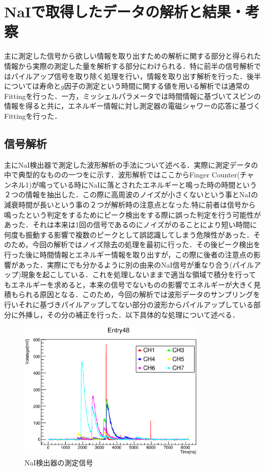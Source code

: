 
%
\section{NaIで取得したデータの解析と結果・考察}
主に測定した信号から欲しい情報を取り出すための解析に関する部分と得られた情報から実際の測定した量を解析する部分にわけられる．特に前半の信号解析ではパイルアップ信号を取り除く処理を行い，情報を取り出す解析を行った．後半については寿命と$g$因子の測定という時間に関する値を用いる解析では通常のFittingを行った．一方，ミッシェルパラメータでは時間情報に基づいてスピンの情報を得ると共に，エネルギー情報に対し測定器の電磁シャワーの応答に基づくFittingを行った．

\subsection{信号解析}
主にNaI検出器で測定した波形解析の手法について述べる．実際に測定データの中で典型的なものの一つをに示す．波形解析ではここからFinger Counter(チャンネル1)が鳴っている時にNaIに落とされたエネルギーと鳴った時の時間という２つの情報を抽出した．この際に高周波のノイズが小さくないという事とNaIの減衰時間が長いという事の２つが解析時の注意点となった.特に前者は信号から鳴ったという判定をするためにピーク検出をする際に誤った判定を行う可能性があった．それは本来は1回の信号であるのにノイズがのることにより短い時間に何度も振動する影響で複数のピークとして誤認識してしまう危険性があった．そのため，今回の解析ではノイズ除去の処理を最初に行った．その後ピーク検出を行った後に時間情報とエネルギー情報を取り出すが，この際に後者の注意点の影響があった．実際にでも分かるように別の由来のNaI信号が重なり合う(パイルアップ)現象を起こしている．これを処理しないままで適当な領域で積分を行ってもエネルギーを求めると，本来の信号でないものの影響でエネルギーが大きく見積もられる原因となる．このため，今回の解析では波形データのサンプリングを行いそれに基づきパイルアップしてない部分の波形からパイルアップしている部分に外挿し，その分の補正を行った．以下具体的な処理について述べる．
\begin{figure}[bht]
  \centering
  \includegraphics[width=0.8\textwidth]{figure/hatano/rawdata.eps}
  \caption{NaI検出器の測定信号}
  \label{hatano_fig:rawdata}
\end{figure}

